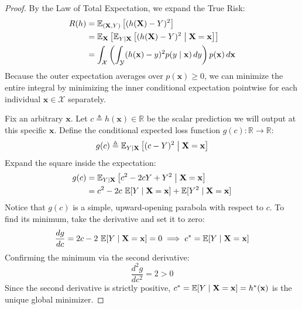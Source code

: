 \begin{proof}
By the Law of Total Expectation, we expand the True Risk:
\begin{align}
R(h) &= \operatorname{\mathbb{E}}_{(\mathbf{X}, Y)} \left[ (h(\mathbf{X}) - Y)^2 \right] \nonumber \\
&= \operatorname{\mathbb{E}}_{\mathbf{X}} \left[ \operatorname{\mathbb{E}}_{Y \mid \mathbf{X}} \left[ (h(\mathbf{X}) - Y)^2 \;\middle|\; \mathbf{X} = \mathbf{x} \right] \right] \nonumber \\
&= \int_{\mathcal{X}} \left( \int_{\mathcal{Y}} (h(\mathbf{x}) - y)^2 p(y \mid \mathbf{x}) \, dy \right) p(\mathbf{x}) \, d\mathbf{x}
\end{align}
Because the outer expectation averages over $p(\mathbf{x}) \ge 0$, we can minimize the entire integral by minimizing the inner conditional expectation pointwise for each individual $\mathbf{x} \in \mathcal{X}$ separately.

Fix an arbitrary $\mathbf{x}$. Let $c \triangleq h(\mathbf{x}) \in \mathbb{R}$ be the scalar prediction we will output at this specific $\mathbf{x}$. Define the conditional expected loss function $g(c): \mathbb{R} \to \mathbb{R}$:
\begin{equation}
g(c) \triangleq \operatorname{\mathbb{E}}_{Y \mid \mathbf{X}} \left[ (c - Y)^2 \;\middle|\; \mathbf{X} = \mathbf{x} \right]
\end{equation}
Expand the square inside the expectation:
\begin{align}
g(c) &= \operatorname{\mathbb{E}}_{Y \mid \mathbf{X}} \left[ c^2 - 2cY + Y^2 \;\middle|\; \mathbf{X} = \mathbf{x} \right] \nonumber \\
&= c^2 - 2c \, \operatorname{\mathbb{E}}[Y \mid \mathbf{X} = \mathbf{x}] + \operatorname{\mathbb{E}}[Y^2 \mid \mathbf{X} = \mathbf{x}]
\end{align}
Notice that $g(c)$ is a simple, upward-opening parabola with respect to $c$. To find its minimum, take the derivative and set it to zero:
\begin{equation}
\frac{dg}{dc} = 2c - 2 \, \operatorname{\mathbb{E}}[Y \mid \mathbf{X} = \mathbf{x}] = 0 \implies c^* = \operatorname{\mathbb{E}}[Y \mid \mathbf{X} = \mathbf{x}]
\end{equation}
Confirming the minimum via the second derivative:
\begin{equation}
\frac{d^2 g}{dc^2} = 2 > 0
\end{equation}
Since the second derivative is strictly positive, $c^* = \operatorname{\mathbb{E}}[Y \mid \mathbf{X} = \mathbf{x}] = h^*(\mathbf{x})$ is the unique global minimizer.
\end{proof}

